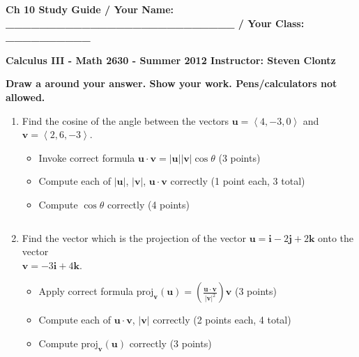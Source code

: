 \documentclass[12pt]{article}
\newcommand{\up}{$~$\vspace*{-0.7in}}
\newcommand{\liner}{\noindent\underline{\hspace*{7in}}}
\newcommand{\spac}{\hspace*{3em}}
\newcommand{\ds}{\displaystyle}
\renewcommand{\vec}{\mathbf}
\newcommand{\veci}{\vec{i}}
\newcommand{\vecj}{\vec{j}}
\newcommand{\veck}{\vec{k}}
\newcommand{\proj}{\mbox{proj}}
\newcommand{\<}{\left<}
\renewcommand{\>}{\right>}
\begin{document}
\up

{ \bf Ch 10 Study Guide / Your Name: \_\_\_\_\_\_\_\_\_\_\_\_\_\_\_\_\_\_\_\_\_\_\_\_\_\_\_ / Your Class: \_\_\_\_\_\_\_\_\_\_}

\vspace*{0.2in}

\centerline{ \bf Calculus III - Math 2630 - Summer 2012 \spac Instructor: Steven Clontz}

\vspace*{0.2in}

{\bf Draw a  around your answer. Show your work. Pens/calculators not allowed.}

\indent\liner


\begin{enumerate}

\item Find the cosine of the angle between the vectors $\vec{u}=\<4,-3,0\>$ and $\vec{v}=\<2,6,-3\>$.

  \begin{itemize}
\item Invoke correct formula $\vec{u}\cdot\vec{v} = |\vec{u}||\vec{v}|\cos \theta$ (3 points)
\item Compute each of $|\vec{u}|$, $|\vec{v}|$, $\vec{u}\cdot\vec{v}$ correctly (1 point each, 3 total)
\item Compute $\cos \theta$ correctly (4 points)
  \end{itemize}

\vspace*{6.5in}

\liner
\newpage\up

\item Find the vector which is the projection of the vector $\vec{u} = \veci-2\vecj+2\veck$ onto the vector \\$\vec{v}=-3\veci+4\veck$.

\begin{itemize}
\item Apply correct formula $\ds\proj_{\vec{v}}(\vec{u}) = \left(\frac{\vec{u}\cdot\vec{v}}{|\vec{v}|^2}\right)\vec{v}$ (3 points)
\item Compute each of $\vec{u}\cdot\vec{v}$, $|\vec{v}|$ correctly (2 points each, 4 total)
\item Compute $\proj_{\vec{v}}(\vec{u})$ correctly (3 points)
\end{itemize}

\vspace*{7in}


\end{enumerate}
\end{document}
